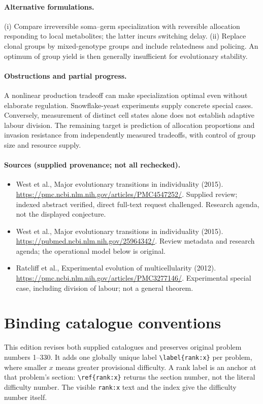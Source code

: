 \documentclass[11pt]{article}
\begin{document}
\paragraph{Alternative formulations.} (i) Compare irreversible soma--germ specialization with reversible allocation responding to local metabolites; the latter incurs switching delay. (ii) Replace clonal groups by mixed-genotype groups and include relatedness and policing. An optimum of group yield is then generally insufficient for evolutionary stability.
\paragraph{Obstructions and partial progress.} A nonlinear production tradeoff can make specialization optimal even without elaborate regulation. Snowflake-yeast experiments supply concrete special cases. Conversely, measurement of distinct cell states alone does not establish adaptive labour division. The remaining target is prediction of allocation proportions and invasion resistance from independently measured tradeoffs, with control of group size and resource supply.
\paragraph{Sources (supplied provenance; not all rechecked).}
\begin{itemize}
\item West et al., Major evolutionary transitions in individuality (2015). \url{https://pmc.ncbi.nlm.nih.gov/articles/PMC4547252/}. Supplied review; indexed abstract verified, direct full-text request challenged. Research agenda, not the displayed conjecture.
\item West et al., Major evolutionary transitions in individuality (2015). \url{https://pubmed.ncbi.nlm.nih.gov/25964342/}. Review metadata and research agenda; the operational model below is original.
\item Ratcliff et al., Experimental evolution of multicellularity (2012). \url{https://pmc.ncbi.nlm.nih.gov/articles/PMC3277146/}. Experimental special case, including division of labour; not a general theorem.
\end{itemize}


\section*{Binding catalogue conventions}
This edition revises both supplied catalogues and preserves original problem numbers 1--330. It adds one globally unique label \verb|\label{rank:x}| per problem, where smaller $x$ means greater provisional difficulty. A rank label is an anchor at that problem's section: \verb|\ref{rank:x}| returns the section number, not the literal difficulty number. The visible \texttt{rank:x} text and the index give the difficulty number itself.
\end{document}
